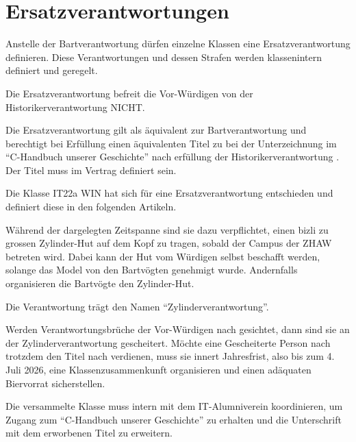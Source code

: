 \documentclass[fontsize=12pt,parskip=half]{scrartcl}
\begin{document}
\section{Ersatzverantwortungen}
\begin{contract}
  \Clause[title={Ersatzverantwortung}]\label{ersatz}
  Anstelle der Bartverantwortung dürfen einzelne Klassen eine Ersatzverantwortung definieren. Diese Verantwortungen und dessen Strafen werden klassenintern
  definiert und geregelt.

  Die Ersatzverantwortung befreit die Vor-Würdigen von der Historikerverantwortung  NICHT.

  Die Ersatzverantwortung gilt als äquivalent zur Bartverantwortung und berechtigt bei Erfüllung einen äquivalenten Titel zu  bei der Unterzeichnung
  im ``C-Handbuch unserer Geschichte'' nach erfüllung der Historikerverantwortung . Der Titel muss im Vertrag definiert sein.

  \Clause[title={Klasse IT22a WIN}]
  Die Klasse IT22a WIN hat sich für eine Ersatzverantwortung entschieden und definiert diese in den folgenden Artikeln.

  \SubClause[title={Ersatzverantwortung}]\label{KlasseIT22aWIN.ersatz}
  Während der  dargelegten Zeitspanne sind sie dazu verpflichtet, einen bizli zu grossen Zylinder-Hut auf dem Kopf zu tragen,
  sobald der Campus der ZHAW betreten wird. Dabei kann der Hut vom Würdigen selbst beschafft werden, solange das Model von den Bartvögten
  genehmigt wurde. Andernfalls organisieren die Bartvögte den Zylinder-Hut.

  Die Verantwortung trägt den Namen ``Zylinderverantwortung''.\label{KlasseIT22aWIN.verantwortung.name}

  \SubClause[title={Verstoss}]
  Werden Verantwortungsbrüche der Vor-Würdigen nach  gesichtet, dann sind sie an der Zylinderverantwortung
   gescheitert. Möchte eine Gescheiterte Person nach  trotzdem den Titel nach
   verdienen, muss sie innert Jahresfrist, also bis zum 4. Juli 2026, eine Klassenzusammenkunft organisieren
  und einen adäquaten Biervorrat sicherstellen.

  Die versammelte Klasse muss intern mit dem IT-Alumniverein koordinieren, um Zugang zum ``C-Handbuch unserer Geschichte'' zu erhalten und die Unterschrift
  mit dem erworbenen Titel zu erweitern.


\end{contract}
\end{document}
